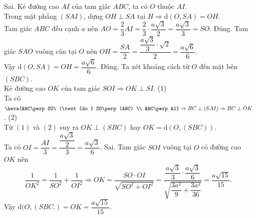 \begin{ex}
{		\begin{itemchoice}
			\itemch Sai. Kẻ đường cao $AI$ của tam giác $ABC$, ta có $O$ thuộc $AI$.\\
			Trong mặt phẳng $(SAI)$, dựng $OH\perp SA$ tại $H\Rightarrow \mathrm{d}(O, SA)=OH$.\\
			Tam giác $ABC$ đều cạnh $a$ nên $AO=\dfrac{2}{3} AI=\dfrac{2}{3} \cdot \dfrac{a \sqrt{3}}{2}=\dfrac{a \sqrt{3}}{3}=SO$.
			\itemch Đúng. Tam giác $SAO$ vuông cân tại $O$ nên $OH=\dfrac{SA}{2}=\dfrac{\dfrac{a \sqrt{3}}{3} \cdot \sqrt{2}}{2}=\dfrac{a \sqrt{6}}{6}$.\\
			Vậy $\mathrm{d}(O, SA)=OH=\dfrac{a\sqrt{6}}{6}$.
			\itemch Đúng. Ta xét khoảng cách từ $O$ đến mặt bên $(SBC)$.\\
			Kẻ đường cao $OK$ của tam giác $SOI\Rightarrow OK\perp SI$. \hfill(1)\\
			Ta có $\heva{&BC\perp SO\ (\text{do } SO\perp(ABC) \\ &BC\perp AI} \Rightarrow BC\perp(SAI) \Rightarrow BC\perp OK$. \hfill(2)\\
			Từ $(1)$ và $(2)$ suy ra $OK\perp(SBC)$ hay $OK=\mathrm{d}(O, (SBC))$.\\
			Ta có ${OI=\dfrac{AI}{3}=\dfrac{\dfrac{a \sqrt{3}}{2}}{3}=\dfrac{a \sqrt{3}}{6}}$.
			\itemch Sai. Tam giác $SOI$ vuông tại $O$ có đường cao $OK$ nên
			$$\dfrac{1}{OK^2}=\dfrac{1}{SO^2}+\dfrac{1}{OI^2} \Rightarrow OK=\dfrac{SO\cdot OI}{\sqrt{SO^2+OI^2}}=\dfrac{\dfrac{a \sqrt{3}}{3} \cdot \dfrac{a \sqrt{3}}{6}}{\sqrt{\dfrac{3a^2}{9}+\dfrac{3a^2}{36}}}=\dfrac{a \sqrt{15}}{15}.$$
			Vậy ${\mathrm{d}(O, (SBC.)=OK=\dfrac{a \sqrt{15}}{15}}$.
		\end{itemchoice}
	}
\end{ex}
